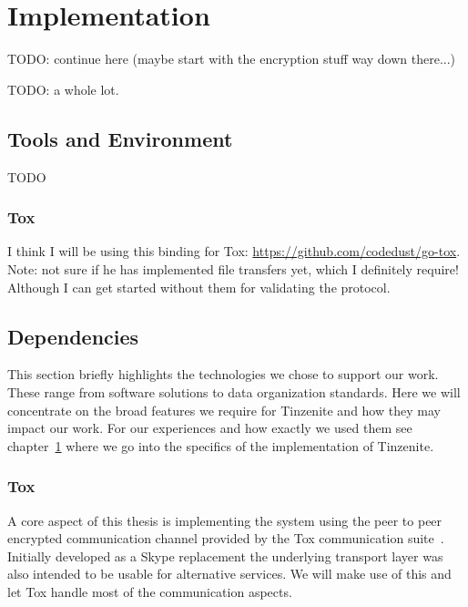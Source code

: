 \chapter{Implementation}
\label{chap:implementation}

TODO: continue here (maybe start with the encryption stuff way down there...)

TODO: a whole lot.

\section{Tools and Environment}

TODO

\subsection{Tox}
\label{sub:Tox}

I think I will be using this binding for Tox: \url{https://github.com/codedust/go-tox}.
Note: not sure if he has implemented file transfers yet, which I definitely require!
Although I can get started without them for validating the protocol.

\section{Dependencies}
\label{sec:Dependencies}

This section briefly highlights the technologies we chose to support our work.
These range from software solutions to data organization standards.
Here we will concentrate on the broad features we require for Tinzenite and how they may impact our work.
For our experiences and how exactly we used them see chapter~\ref{chap:implementation} where we go into the specifics of the implementation of Tinzenite.

\subsection{Tox}

A core aspect of this thesis is implementing the system using the peer to peer encrypted communication channel provided by the Tox communication suite~\cite{web:site:tox}.
Initially developed as a Skype replacement the underlying transport layer was also intended to be usable for alternative services.
We will make use of this and let Tox handle most of the communication aspects.

